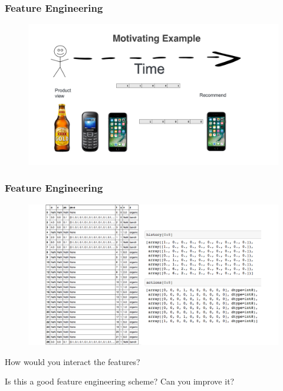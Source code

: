  \begin{frame}
  \frametitle{Feature Engineering}
 
 
   \begin{figure}[h!]
     \includegraphics[scale=0.25]{images/feat_eng4.png}
       \centering
       \label{motex1}
   \end{figure}
     
 \end{frame}



\begin{frame}
  \frametitle{Feature Engineering}
\begin{figure}[h!]
\includegraphics[scale=0.3]{images/feature_engineering.png}
\centering
\end{figure}

\pause
How would you interact the features?

\pause
Is this a good feature engineering scheme?  Can you improve it?
\end{frame}




